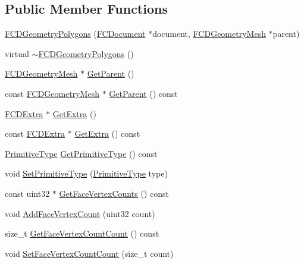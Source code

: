\subsection*{Public Member Functions}
\begin{DoxyCompactItemize}
\item 
\hyperlink{classFCDGeometryPolygons_a4c56f499ac09bcf2cd144c2848a0a08b}{FCDGeometryPolygons} (\hyperlink{classFCDocument}{FCDocument} $\ast$document, \hyperlink{classFCDGeometryMesh}{FCDGeometryMesh} $\ast$parent)
\item 
virtual \hyperlink{classFCDGeometryPolygons_ac4fdd79f4400a6f0c65dccf15e3c1a5b}{$\sim$FCDGeometryPolygons} ()
\item 
\hyperlink{classFCDGeometryMesh}{FCDGeometryMesh} $\ast$ \hyperlink{classFCDGeometryPolygons_a734b90161e968c1e35e1349d60b399be}{GetParent} ()
\item 
const \hyperlink{classFCDGeometryMesh}{FCDGeometryMesh} $\ast$ \hyperlink{classFCDGeometryPolygons_abcd0f7f55db3017bb4b5fbc3dff037e4}{GetParent} () const 
\item 
\hyperlink{classFCDExtra}{FCDExtra} $\ast$ \hyperlink{classFCDGeometryPolygons_a54a957cf0373ee1fd9be64f4efbcbbee}{GetExtra} ()
\item 
const \hyperlink{classFCDExtra}{FCDExtra} $\ast$ \hyperlink{classFCDGeometryPolygons_a1f1331216a3fbe3add14502805763bb6}{GetExtra} () const 
\item 
\hyperlink{classFCDGeometryPolygons_a78fd93579665ea37c6d3396f4c4e8fac}{PrimitiveType} \hyperlink{classFCDGeometryPolygons_abedbad52108a86ba7fa2f8c98b39ab85}{GetPrimitiveType} () const 
\item 
void \hyperlink{classFCDGeometryPolygons_a187f864d831817aae1df92ac5f51a3d0}{SetPrimitiveType} (\hyperlink{classFCDGeometryPolygons_a78fd93579665ea37c6d3396f4c4e8fac}{PrimitiveType} type)
\item 
const uint32 $\ast$ \hyperlink{classFCDGeometryPolygons_ab7fad74395b260ad1ff0f94e5a56d1e4}{GetFaceVertexCounts} () const 
\item 
void \hyperlink{classFCDGeometryPolygons_a37d030e5ba34f0bbb007c7fd37d364e2}{AddFaceVertexCount} (uint32 count)
\item 
size\_\-t \hyperlink{classFCDGeometryPolygons_adb9b5d828babdd8fae20a94bbb867de1}{GetFaceVertexCountCount} () const 
\item 
void \hyperlink{classFCDGeometryPolygons_a0376390ca4fd7be5d6d612104b5a5210}{SetFaceVertexCountCount} (size\_\-t count)
\item 

\end{DoxyCompactItemize}
